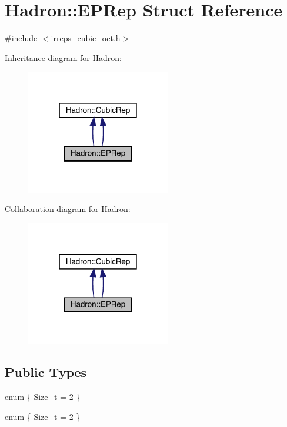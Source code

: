 \hypertarget{structHadron_1_1EPRep}{}\section{Hadron\+:\+:E\+P\+Rep Struct Reference}
\label{structHadron_1_1EPRep}


{\ttfamily \#include $<$irreps\+\_\+cubic\+\_\+oct.\+h$>$}



Inheritance diagram for Hadron\+:\nopagebreak
\begin{figure}[H]
\begin{center}
\leavevmode
\includegraphics[width=178pt]{d8/d73/structHadron_1_1EPRep__inherit__graph}
\end{center}
\end{figure}


Collaboration diagram for Hadron\+:\nopagebreak
\begin{figure}[H]
\begin{center}
\leavevmode
\includegraphics[width=178pt]{dc/d5b/structHadron_1_1EPRep__coll__graph}
\end{center}
\end{figure}
\subsection*{Public Types}
\begin{DoxyCompactItemize}
\item 
enum \{ \mbox{\hyperlink{structHadron_1_1EPRep_a80b6a6715807bd9e591db0488df0e456acb7f3437b2518d8dcf731196499ff41c}{Size\+\_\+t}} = 2
 \}
\item 
enum \{ \mbox{\hyperlink{structHadron_1_1EPRep_a80b6a6715807bd9e591db0488df0e456acb7f3437b2518d8dcf731196499ff41c}{Size\+\_\+t}} = 2
 \}
\end{DoxyCompactItemize}
